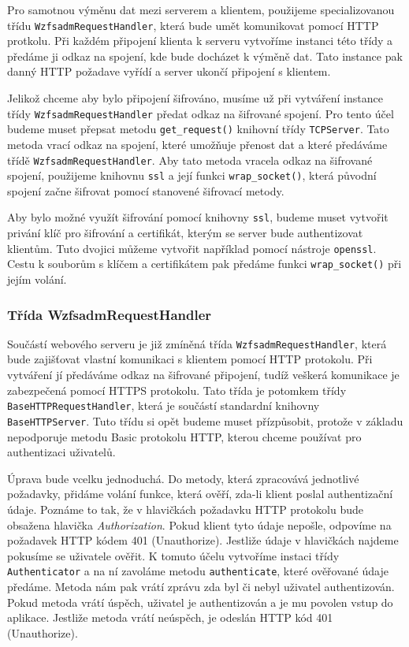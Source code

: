     Pro samotnou výměnu dat mezi serverem a klientem, použijeme specializovanou třídu \verb|WzfsadmRequestHandler|, která bude umět komunikovat pomocí HTTP protkolu. Při každém připojení klienta k serveru vytvoříme instanci této třídy a předáme ji odkaz na spojení, kde bude docházet k výměně dat. Tato instance pak danný HTTP požadave vyřídí a server ukončí připojení s klientem.
    
    Jelikož chceme aby bylo připojení šifrováno, musíme už při vytváření instance třídy \verb|WzfsadmRequestHandler| předat odkaz na šifrované spojení. Pro tento účel budeme muset přepsat metodu \verb|get_request()| knihovní třídy \verb|TCPServer|. Tato metoda vrací odkaz na spojení, které umožňuje přenost dat a které předáváme třídě \verb|WzfsadmRequestHandler|. Aby tato metoda vracela odkaz na šifrované spojení, použijeme knihovnu \verb|ssl| a její funkci \verb|wrap_socket()|, která původní spojení začne šifrovat pomocí stanovené šifrovací metody. 
    
    Aby bylo možné využít šifrování pomocí knihovny \verb|ssl|, budeme muset vytvořit privání klíč pro šifrování a certifikát, kterým se server bude authentizovat klientům. Tuto dvojici můžeme vytvořit například pomocí nástroje \verb|openssl|. Cestu k souborům s klíčem a certifikátem pak předáme funkci \verb|wrap_socket()| při jejím volání.
    \subsubsection{Třída WzfsadmRequestHandler}
    Součástí webového serveru je již zmíněná třída \verb|WzfsadmRequestHandler|, která bude zajišťovat vlastní komunikaci s klientem pomocí HTTP protokolu. Při vytváření jí předáváme odkaz na šifrované připojení, tudíž veškerá komunikace je zabezpečená pomocí HTTPS protokolu. Tato třída je potomkem třídy \verb|BaseHTTPRequestHandler|, která je součástí standardní knihovny \verb|BaseHTTPServer|. Tuto třídu si opět budeme muset přízpůsobit, protože v základu nepodporuje metodu Basic protokolu HTTP, kterou chceme používat pro authentizaci uživatelů.
    
    Úprava bude vcelku jednoduchá. Do metody, která zpracovává jednotlivé požadavky, přidáme volání funkce, která ověří, zda-li klient poslal authentizační údaje. Poznáme to tak, že v hlavičkách požadavku HTTP protokolu bude obsažena hlavička \emph{Authorization}. Pokud klient tyto údaje nepošle, odpovíme na požadavek HTTP kódem 401 (Unauthorize). Jestliže údaje v hlavičkách najdeme pokusíme se uživatele ověřit. K tomuto účelu vytvoříme instaci třídy \verb|Authenticator| a na ní zavoláme metodu \verb|authenticate|, které ověřované údaje předáme. Metoda nám pak vrátí zprávu zda byl či nebyl uživatel authentizován. Pokud metoda vrátí úspěch, uživatel je authentizován a je mu povolen vstup do aplikace. Jestliže metoda vrátí neúspěch, je odeslán HTTP kód 401 (Unauthorize).
    
